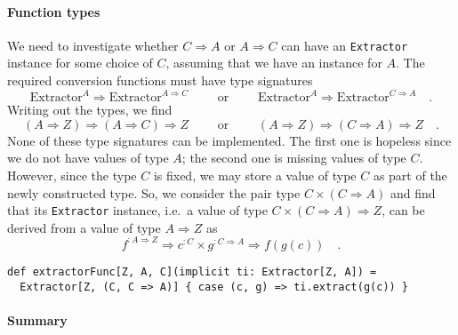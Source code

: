 \paragraph{Function types}

We need to investigate whether $C\Rightarrow A$ or $A\Rightarrow C$
can have an \lstinline!Extractor! instance for some choice of $C$,
assuming that we have an instance for $A$. The required conversion
functions must have type signatures
\[
\text{Extractor}^{A}\Rightarrow\text{Extractor}^{A\Rightarrow C}\quad\quad\text{ or }\quad\quad\text{Extractor}^{A}\Rightarrow\text{Extractor}^{C\Rightarrow A}\quad.
\]
Writing out the types, we find
\[
\left(A\Rightarrow Z\right)\Rightarrow\left(A\Rightarrow C\right)\Rightarrow Z\quad\quad\text{ or }\quad\quad\left(A\Rightarrow Z\right)\Rightarrow\left(C\Rightarrow A\right)\Rightarrow Z\quad.
\]
None of these type signatures can be implemented. The first one is
hopeless since we do not have values of type $A$; the second one
is missing values of type $C$. However, since the type $C$ is fixed,
we may store a value of type $C$ as part of the newly constructed
type. So, we consider the pair type $C\times\left(C\Rightarrow A\right)$
and find that its \lstinline!Extractor! instance, i.e.~a value of
type $C\times\left(C\Rightarrow A\right)\Rightarrow Z$, can be derived
from a value of type $A\Rightarrow Z$ as
\[
f^{:A\Rightarrow Z}\Rightarrow c^{:C}\times g^{:C\Rightarrow A}\Rightarrow f(g(c))\quad.
\]
\begin{lstlisting}
def extractorFunc[Z, A, C](implicit ti: Extractor[Z, A]) =
  Extractor[Z, (C, C => A)] { case (c, g) => ti.extract(g(c)) }
\end{lstlisting}


\paragraph{Summary}

